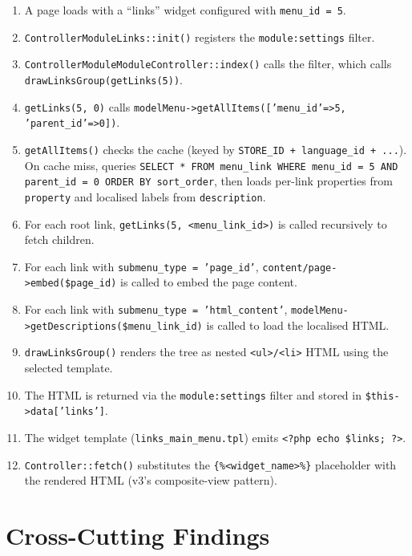 \documentclass[11pt,a4paper]{article}
\begin{document}
\begin{enumerate}[leftmargin=1.6em,itemsep=2pt]
  \item A page loads with a ``links'' widget configured with
        \texttt{menu\_id = 5}.
  \item \texttt{ControllerModuleLinks::init()} registers the
        \texttt{module:settings} filter.
  \item \texttt{ControllerModuleModuleController::index()} calls the
        filter, which calls
        \texttt{drawLinksGroup(getLinks(5))}.
  \item \texttt{getLinks(5, 0)} calls
        \texttt{modelMenu->getAllItems(['menu\_id'=>5,
        'parent\_id'=>0])}.
  \item \texttt{getAllItems()} checks the cache (keyed by
        \texttt{STORE\_ID + language\_id + ...}). On cache miss,
        queries \texttt{SELECT * FROM menu\_link WHERE menu\_id = 5
        AND parent\_id = 0 ORDER BY sort\_order}, then loads
        per-link properties from \texttt{property} and localised
        labels from \texttt{description}.
  \item For each root link, \texttt{getLinks(5, <menu\_link\_id>)}
        is called recursively to fetch children.
  \item For each link with \texttt{submenu\_type = 'page\_id'},
        \texttt{content/page->embed(\$page\_id)} is called to
        embed the page content.
  \item For each link with \texttt{submenu\_type = 'html\_content'},
        \texttt{modelMenu->getDescriptions(\$menu\_link\_id)} is
        called to load the localised HTML.
  \item \texttt{drawLinksGroup()} renders the tree as nested
        \texttt{<ul>/<li>} HTML using the selected template.
  \item The HTML is returned via the \texttt{module:settings} filter
        and stored in \texttt{\$this->data['links']}.
  \item The widget template (\texttt{links\_main\_menu.tpl}) emits
        \texttt{<?php echo \$links; ?>}.
  \item \texttt{Controller::fetch()} substitutes the
        \texttt{\{\%<widget\_name>\%\}} placeholder with the rendered
        HTML (v3's composite-view pattern).
\end{enumerate}

\section{Cross-Cutting Findings}\label{sec:findings}
\end{document}
